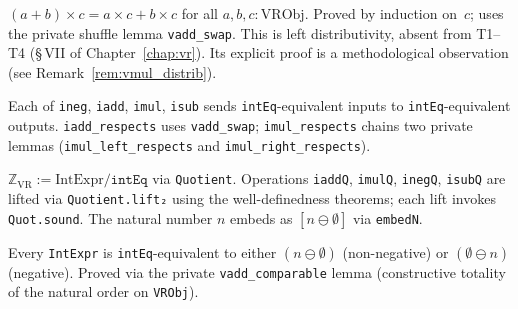 \begin{theorem}
\label{thm:vmul_distrib_right}
\leanok
{}
$(a + b) \times c = a \times c + b \times c$ for all $a, b, c : \mathrm{VRObj}$.
Proved by induction on~$c$; uses the private shuffle lemma \texttt{vadd\_swap}.
This is left distributivity, absent from T1--T4 (\S\,VII of Chapter~\ref{chap:vr}).
Its explicit proof is a methodological observation (see Remark~\ref{rem:vmul_distrib}).
\end{theorem}

\begin{theorem}
\label{thm:int_ops_wd}
\leanok
{}
Each of \texttt{ineg}, \texttt{iadd}, \texttt{imul}, \texttt{isub} sends
\texttt{intEq}-equivalent inputs to \texttt{intEq}-equivalent outputs.
\texttt{iadd\_respects} uses \texttt{vadd\_swap};
\texttt{imul\_respects} chains two private lemmas
(\texttt{imul\_left\_respects} and \texttt{imul\_right\_respects}).
\end{theorem}

\begin{definition}
\label{def:IntVR}
\leanok
{}
$\mathbb{Z}_{\mathrm{VR}} := \mathrm{IntExpr} / \texttt{intEq}$ via
\texttt{Quotient}.  Operations \texttt{iaddQ}, \texttt{imulQ},
\texttt{inegQ}, \texttt{isubQ} are lifted via \texttt{Quotient.lift₂}
using the well-definedness theorems; each lift invokes \texttt{Quot.sound}.
The natural number $n$ embeds as $[n \ominus \emptyset]$ via \texttt{embedN}.
\end{definition}

\begin{theorem}
\label{thm:canonical_form}
\leanok
{}
Every \texttt{IntExpr} is \texttt{intEq}-equivalent to either
$(n \ominus \emptyset)$ (non-negative) or $(\emptyset \ominus n)$ (negative).
Proved via the private \texttt{vadd\_comparable} lemma (constructive totality
of the natural order on \texttt{VRObj}).
\end{theorem}

